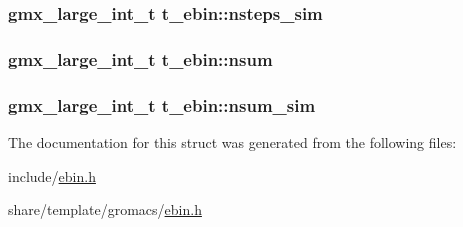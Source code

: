 \hypertarget{structt__ebin_af2553f80cc1b7109b5123f93ca7616c4}{
\subsubsection[{nsteps\-\_\-sim}]{\setlength{\rightskip}{0pt plus 5cm}gmx\-\_\-large\-\_\-int\-\_\-t {\bf t\-\_\-ebin\-::nsteps\-\_\-sim}}}\label{structt__ebin_af2553f80cc1b7109b5123f93ca7616c4}
\hypertarget{structt__ebin_a2884d8733e4e9fb8c7ffdc6746f6fe99}{
\subsubsection[{nsum}]{\setlength{\rightskip}{0pt plus 5cm}gmx\-\_\-large\-\_\-int\-\_\-t {\bf t\-\_\-ebin\-::nsum}}}\label{structt__ebin_a2884d8733e4e9fb8c7ffdc6746f6fe99}
\hypertarget{structt__ebin_aff2fa75369d9b826882d702d943c0a48}{
\subsubsection[{nsum\-\_\-sim}]{\setlength{\rightskip}{0pt plus 5cm}gmx\-\_\-large\-\_\-int\-\_\-t {\bf t\-\_\-ebin\-::nsum\-\_\-sim}}}\label{structt__ebin_aff2fa75369d9b826882d702d943c0a48}


\-The documentation for this struct was generated from the following files\-:\begin{DoxyCompactItemize}
\item 
include/\hyperlink{include_2ebin_8h}{ebin.\-h}\item 
share/template/gromacs/\hyperlink{share_2template_2gromacs_2ebin_8h}{ebin.\-h}\end{DoxyCompactItemize}
